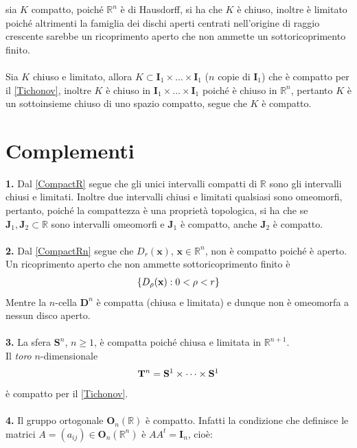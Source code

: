 \documentclass[oneside, 11pt]{amsbook}
\makeatletter
\newcommand{\0}{{(0)}}
\newcommand{\3}{{(3)}}
\theoremstyle{colonplain}
\theoremstyle{colondefinition}
\theoremstyle{colonremark}
\numberwithin{equation}{chapter}
\renewcommand{\proofname}{Dimostrazione}
\renewenvironment{proof}[1][\proofname]{\par
  \pushQED{\qed}%
  \normalfont \topsep6\p@\@plus6\p@\relax
  \trivlist
  \item[\hskip\labelsep\bfseries #1:]\ignorespaces
}{%
  \popQED\endtrivlist\@endpefalse
}
\makeatother
\begin{document}
\begin{proof}
sia $K$ compatto, poiché $\mathbb{R}^n$ è di Hausdorff, si ha che $K$ è chiuso, inoltre è limitato poiché altrimenti la famiglia dei dischi aperti centrati nell'origine di raggio crescente sarebbe un ricoprimento aperto che non ammette un sottoricoprimento finito. \\ \\
Sia $K$ chiuso e limitato, allora $K \subset \mathbf{I}_1 \times \dots \times \mathbf{I}_1$ ($n$ copie di $\mathbf{I}_1$) che è compatto per il \cref{Tichonov}, inoltre $K$ è chiuso in $\mathbf{I}_1 \times \dots \times \mathbf{I}_1$ poiché è chiuso in $\mathbb{R}^n$, pertanto $K$ è un sottoinsieme chiuso di uno spazio compatto, segue che $K$ è compatto.
\end{proof}

\section{Complementi}
\textbf{1.} Dal \cref{CompactR} segue che gli unici intervalli compatti di $\mathbb{R}$ sono gli intervalli chiusi e limitati. Inoltre due intervalli chiusi e limitati qualsiasi sono omeomorfi, pertanto, poiché la compattezza è una proprietà topologica, si ha che se $\mathbf{J}_1, \mathbf{J}_2 \subset \mathbb{R}$ sono intervalli omeomorfi e $\mathbf{J}_1$ è compatto, anche $\mathbf{J}_2$ è compatto. \\ \\
\textbf{2.} Dal \cref{CompactRn} segue che $D_r(\mathbf{x})$, $\mathbf{x} \in \mathbb{R}^n$, non è compatto poiché è aperto. Un ricoprimento aperto che non ammette sottoricoprimento finito è
\begin{align}
    \{ D_\rho (\mathbf{x}) : 0 < \rho < r \} \notag
\end{align}
Mentre la $n$-cella $\mathbf{D}^n$ è compatta (chiusa e limitata) e dunque non è omeomorfa a nessun disco aperto. \\ \\
\textbf{3.} La sfera $\mathbf{S}^n$, $n \geq 1$, è compatta poiché chiusa e limitata in $\mathbb{R}^{n + 1}$. \\
Il \textit{toro} $n$-dimensionale
\begin{align}
    \mathbf{T}^n = \mathbf{S}^1 \times \dots \times \mathbf{S}^1 \notag
\end{align}
è compatto per il \cref{Tichonov}. \\ \\
\textbf{4.} Il gruppo ortogonale $\mathbf{O}_n(\mathbb{R})$ è compatto. Infatti la condizione che definisce le matrici $A = (a_{ij}) \in \mathbf{O}_n(\mathbb{R}^n)$ è $AA^t = \mathbf{I}_n$, cioè:
\end{document}
